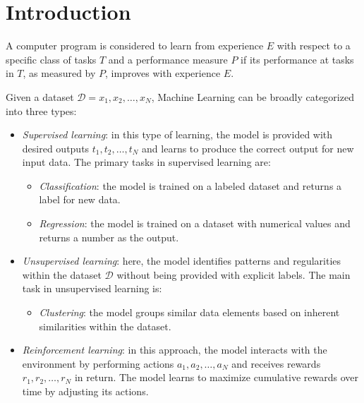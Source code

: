 \section{Introduction}

\begin{definition}
    A computer program is considered to learn from experience $E$ with respect to a specific class of tasks $T$ and a performance measure $P$ if its performance at tasks in $T$, as measured by $P$, improves with experience $E$.
\end{definition}
Given a dataset $\mathcal{D} = {x_1, x_2, \dots, x_N}$, Machine Learning can be broadly categorized into three types:
\begin{itemize} 
    \item \textit{Supervised learning}: in this type of learning, the model is provided with desired outputs ${t_1, t_2, \dots, t_N}$ and learns to produce the correct output for new input data. 
        The primary tasks in supervised learning are: 
        \begin{itemize} 
            \item \textit{Classification}: the model is trained on a labeled dataset and returns a label for new data. 
            \item \textit{Regression}: the model is trained on a dataset with numerical values and returns a number as the output. 
        \end{itemize} 
    \item \textit{Unsupervised learning}: here, the model identifies patterns and regularities within the dataset $\mathcal{D}$ without being provided with explicit labels. 
        The main task in unsupervised learning is: 
        \begin{itemize} 
            \item \textit{Clustering}: the model groups similar data elements based on inherent similarities within the dataset. 
        \end{itemize} 
    \item \textit{Reinforcement learning}: in this approach, the model interacts with the environment by performing actions ${a_1, a_2, \dots, a_N}$ and receives rewards ${r_1, r_2, \dots, r_N}$ in return. 
        The model learns to maximize cumulative rewards over time by adjusting its actions. 
\end{itemize}
